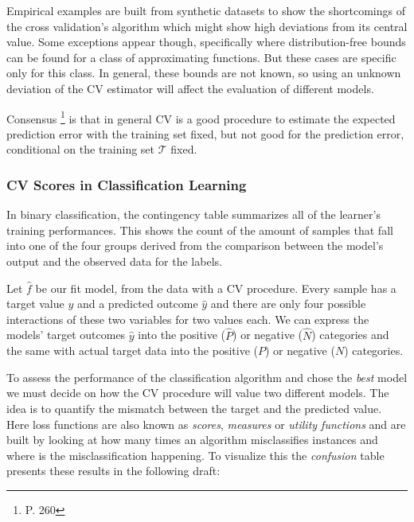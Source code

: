 Empirical examples are built from synthetic datasets to show the shortcomings of the cross validation's algorithm which might show high deviations from its central value. Some exceptions appear though, specifically where distribution-free bounds can be found for a class of approximating functions. But these cases are specific only for this class. In general, these bounds are not known, so using an unknown deviation of the CV estimator will affect the evaluation of different models.

Consensus \footnote{\textcite{hastie-elemstatslearn} P. 260} is that in general CV is a good procedure to estimate the expected prediction error with the training set fixed, but not good for the prediction error, conditional on the training set $\mathcal{T}$ fixed.



\subsubsection{CV Scores in Classification Learning}

In binary classification, the contingency table summarizes all of the learner's training performances. This shows the count of the amount of samples that fall into one of the four groups derived from the comparison between the model's output and the observed data for the labels.

 Let $\hat{f}$ be our fit model, from the data with a CV procedure. Every sample has a target value $y$ and a predicted outcome $\hat{y}$ and there are only four possible interactions of these two variables for two values each.  We can express the models' target outcomes $\hat{y}$ into the positive ($\hat{P}$) or negative ($\hat{N}$) categories and the same with actual target data into the positive ($P$) or negative ($N$) categories.

To assess the performance of the classification algorithm and chose the \textit{best} model we must decide on how the CV procedure will value two different models. The idea is to quantify the mismatch between the target  and the predicted value. Here loss functions are also known as \textit{scores}, \textit{measures} or \textit{utility functions} and are built by looking at how many times an algorithm  misclassifies instances and where is the misclassification happening. To visualize this the \textit{confusion} table presents these results in the following draft:

